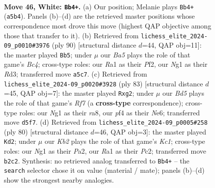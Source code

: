 \documentclass[11pt]{article}
\begin{document}
\clearpage

\begin{figure}[p]\centering
\begin{subfigure}{0.46\textwidth}\centering
\resizebox{\linewidth}{!}{%
\newchessgame
\chessboard[
  setfen={6r1/4k3/r7/B2B2p1/5pb1/PP6/1K5P/R5N1 w - - 0 46},
  showmover=false,
  pgfstyle=straightmove, color=movearrow, markmove={a5-b4}
]}
\caption{}
\end{subfigure}\hfill
\begin{subfigure}{0.46\textwidth}\centering
\resizebox{\linewidth}{!}{%
\newchessgame
\chessboard[
  setfen={8/2r4p/5bpk/2N5/1PB5/3R2PP/5PK1/4r3 w - - 5 46},
  showmover=false,
  pgfstyle=straightmove, color=movearrow, markmove={c4-b5}
]}
\caption{}
\end{subfigure}
\\[4pt]
\begin{subfigure}{0.46\textwidth}\centering
\resizebox{\linewidth}{!}{%
\newchessgame
\chessboard[
  setfen={R7/5p2/4nkpp/P7/8/3b3P/5rP1/7K b - - 0 42},
  showmover=false,
  pgfstyle=straightmove, color=movearrow, markmove={f2-g2}
]}
\caption{}
\end{subfigure}\hfill
\begin{subfigure}{0.46\textwidth}\centering
\resizebox{\linewidth}{!}{%
\newchessgame
\chessboard[
  setfen={6k1/1p1r4/p6R/3NB3/4P3/8/PPP1n3/2K5 w - - 5 41},
  showmover=false,
  pgfstyle=straightmove, color=movearrow, markmove={c1-d2}
]}
\caption{}
\end{subfigure}
\caption{\textbf{Move 46, White: \texttt{Bb4+}.} (a) Our position; Melanie plays \texttt{Bb4+} (\texttt{a5b4}). Panels (b)--(d) are the retrieved master positions whose correspondence most drove this move (highest QAP objective among those that transfer to it). (b) Retrieved from \texttt{lichess\_elite\_2024-09\_p0010\#3976} (ply 90) [structural distance $d$=44, QAP obj=11]: the master played \texttt{Bb5}; under $\mu$ our \emph{Ba5} plays the role of that game's \emph{Bc4}; cross-type roles: our \emph{R}a1 as their \emph{P}f2, our \emph{N}g1 as their \emph{R}d3; transferred move \texttt{a5c7}. (c) Retrieved from \texttt{lichess\_elite\_2024-09\_p0020\#3928} (ply 83) [structural distance $d$=45, QAP obj=7]: the master played \texttt{Rxg2}; under $\mu$ our \emph{Bd5} plays the role of that game's \emph{Rf7} (a \textbf{cross-type} correspondence); cross-type roles: our \emph{N}g1 as their \emph{r}a8, our \emph{p}f4 as their \emph{N}e6; transferred move \texttt{d5f7}. (d) Retrieved from \texttt{lichess\_elite\_2024-09\_p0005\#258} (ply 80) [structural distance $d$=46, QAP obj=3]: the master played \texttt{Kd2}; under $\mu$ our \emph{Kb2} plays the role of that game's \emph{Kc1}; cross-type roles: our \emph{N}g1 as their \emph{P}a2, our \emph{R}a1 as their \emph{P}c2; transferred move \texttt{b2c2}. Synthesis: no retrieved analog transferred to \texttt{Bb4+} -- the \texttt{search} selector chose it on value (material / mate); panels (b)--(d) show the strongest nearby analogies.}
\label{fig:thought-m90}
\end{figure}
\end{document}
